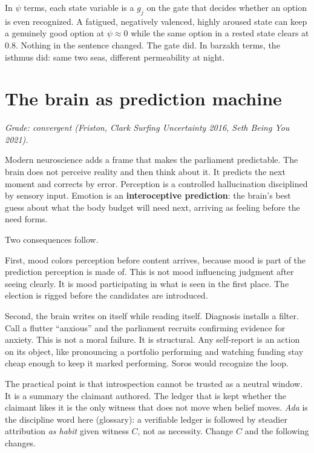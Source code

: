 In $\psi$ terms, each state variable is a $g_j$ on the gate that decides whether an option is even recognized. A fatigued, negatively valenced, highly aroused state can keep a genuinely good option at $\psi \approx 0$ while the same option in a rested state clears at $0.8$. Nothing in the sentence changed. The gate did. In barzakh terms, the isthmus did: same two seas, different permeability at night.

\section{The brain as prediction machine}

\textit{Grade: convergent (Friston, Clark \textit{Surfing Uncertainty} 2016, Seth \textit{Being You} 2021).}

Modern neuroscience adds a frame that makes the parliament predictable. The brain does not perceive reality and then think about it. It predicts the next moment and corrects by error. Perception is a controlled hallucination disciplined by sensory input. Emotion is an \textbf{interoceptive prediction}: the brain's best guess about what the body budget will need next, arriving as feeling before the need forms.

Two consequences follow.

First, mood colors perception before content arrives, because mood is part of the prediction perception is made of. This is not mood influencing judgment after seeing clearly. It is mood participating in what is seen in the first place. The election is rigged before the candidates are introduced.

Second, the brain writes on itself while reading itself. Diagnosis installs a filter. Call a flutter ``anxious'' and the parliament recruits confirming evidence for anxiety. This is not a moral failure. It is structural. Any self-report is an action on its object, like pronouncing a portfolio performing and watching funding stay cheap enough to keep it marked performing. Soros would recognize the loop.

The practical point is that introspection cannot be trusted as a neutral window. It is a summary the claimant authored. The ledger that is kept whether the claimant likes it is the only witness that does not move when belief moves. \textit{Ada} is the discipline word here (glossary): a verifiable ledger is followed by steadier attribution \textit{as habit} given witness $C$, not as necessity. Change $C$ and the following changes.

